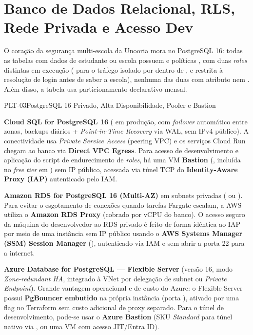 \section{Banco de Dados Relacional, RLS, Rede Privada e Acesso Dev}

O coração da segurança multi-escola da Unooria mora no PostgreSQL 16: todas as
tabelas com dados de estudante ou escola possuem  e
políticas , com duas \emph{roles} distintas em
execução ( para o tráfego isolado por  dentro de , e  restrita à resolução
de login antes de saber a escola), nenhuma das duas com atributo 
nem . Além disso, a tabela  usa
particionamento declarativo mensal.

\begin{pecaarq}{PLT-03}{PostgreSQL 16 Privado, Alta Disponibilidade, Pooler e Bastion}{\sgcp~\nativo\enspace\saws~\equivalente\enspace\sazure~\nativo}
\begin{campos}
  \item[Como é hoje (GCP)] \textbf{Cloud SQL for PostgreSQL 16} (
    em produção,  com \emph{failover}
    automático entre zonas, backups diários + \emph{Point-in-Time Recovery} via
    WAL, sem IPv4 público). A conectividade usa \emph{Private Service Access}
    (peering VPC) e os serviços Cloud Run chegam ao banco via \textbf{Direct VPC
    Egress}. Para acesso de desenvolvimento e aplicação do script de
    endurecimento de \emph{roles}, há uma VM \textbf{Bastion} (,
    incluída no \emph{free tier} em ) sem IP público, acessada via
    túnel TCP do \textbf{Identity-Aware Proxy (IAP)} autenticado pelo IAM.
  \item[Equivalente AWS] \textbf{Amazon RDS for PostgreSQL 16 (Multi-AZ)} em
    subnets privadas ( ou ). Para evitar o
    esgotamento de conexões quando tarefas Fargate escalam, a AWS utiliza o
    \textbf{Amazon RDS Proxy} (cobrado por vCPU do banco). O acesso seguro da
    máquina do desenvolvedor ao RDS privado é feito de forma idêntica ao IAP por
    meio de uma instância  sem IP público usando o \textbf{AWS
    Systems Manager (SSM) Session Manager} (),
    autenticado via IAM e sem abrir a porta 22 para a internet.
  \item[Equivalente Azure] \textbf{Azure Database for PostgreSQL --- Flexible
    Server} (versão 16, modo \emph{Zone-redundant HA}, integrado à VNet por
    delegação de subnet ou \emph{Private Endpoint}). Grande vantagem operacional
    e de custo do Azure: o Flexible Server possui \textbf{PgBouncer embutido} na
    própria instância (porta ), ativado por uma flag no Terraform sem
    custo adicional de proxy separado. Para o túnel de desenvolvimento, pode-se
    usar o \textbf{Azure Bastion} (SKU \emph{Standard} para túnel nativo via
    , ou uma VM  com acesso JIT/Entra ID).
\end{campos}
\end{pecaarq}

